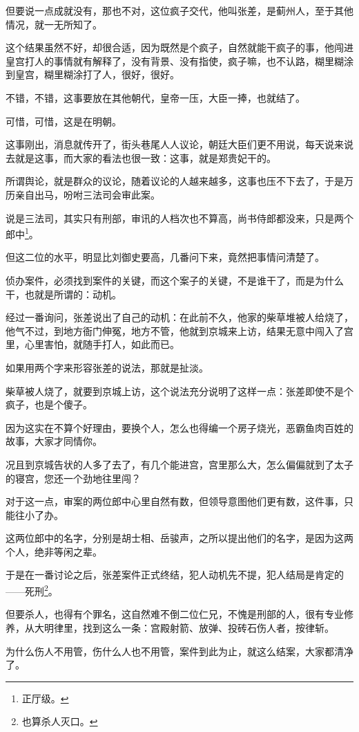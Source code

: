 \begin{multicols}{\theparacolNo}
		但要说一点成就没有，那也不对，这位疯子交代，他叫张差，是蓟州人，至于其他情况，就一无所知了。

		这个结果虽然不好，却很合适，因为既然是个疯子，自然就能干疯子的事，他闯进皇宫打人的事情就有解释了，没有背景、没有指使，疯子嘛，也不认路，糊里糊涂到皇宫，糊里糊涂打了人，很好，很好。

		不错，不错，这事要放在其他朝代，皇帝一压，大臣一捧，也就结了。

		可惜，可惜，这是在明朝。

		这事刚出，消息就传开了，街头巷尾人人议论，朝廷大臣们更不用说，每天说来说去就是这事，而大家的看法也很一致：这事，就是郑贵妃干的。

		所谓舆论，就是群众的议论，随着议论的人越来越多，这事也压不下去了，于是万历亲自出马，吩咐三法司会审此案。

		说是三法司，其实只有刑部，审讯的人档次也不算高，尚书侍郎都没来，只是两个郎中\footnote{正厅级。}。

		但这二位的水平，明显比刘御史要高，几番问下来，竟然把事情问清楚了。

		侦办案件，必须找到案件的关键，而这个案子的关键，不是谁干了，而是为什么干，也就是所谓的：动机。

		经过一番询问，张差说出了自己的动机：在此前不久，他家的柴草堆被人给烧了，他气不过，到地方衙门伸冤，地方不管，他就到京城来上访，结果无意中闯入了宫里，心里害怕，就随手打人，如此而已。

		如果用两个字来形容张差的说法，那就是扯淡。

		柴草被人烧了，就要到京城上访，这个说法充分说明了这样一点：张差即使不是个疯子，也是个傻子。

		因为这实在不算个好理由，要换个人，怎么也得编一个房子烧光，恶霸鱼肉百姓的故事，大家才同情你。

		况且到京城告状的人多了去了，有几个能进宫，宫里那么大，怎么偏偏就到了太子的寝宫，您还一个劲地往里闯？

		对于这一点，审案的两位郎中心里自然有数，但领导意图他们更有数，这件事，只能往小了办。

		这两位郎中的名字，分别是胡士相、岳骏声，之所以提出他们的名字，是因为这两个人，绝非等闲之辈。

		于是在一番讨论之后，张差案件正式终结，犯人动机先不提，犯人结局是肯定的——死刑\footnote{也算杀人灭口。}。

		但要杀人，也得有个罪名，这自然难不倒二位仁兄，不愧是刑部的人，很有专业修养，从大明律里，找到这么一条：宫殿射箭、放弹、投砖石伤人者，按律斩。

		为什么伤人不用管，伤什么人也不用管，案件到此为止，就这么结案，大家都清净了。


\end{multicols}
